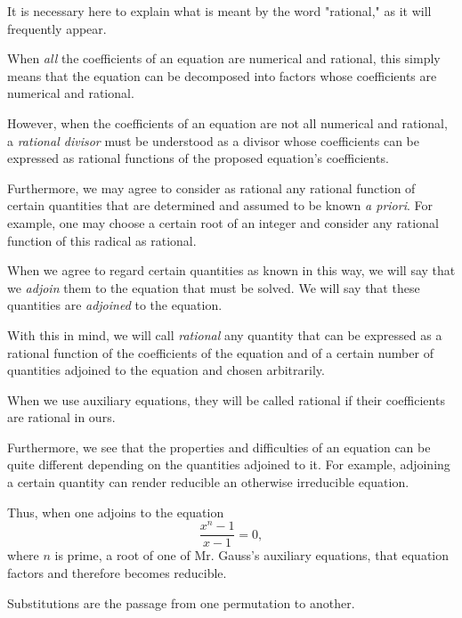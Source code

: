 \documentclass{article}
\begin{document}
It is necessary here to explain what is meant by the word "rational," as it will frequently appear.

When \textit{all} the coefficients of an equation are numerical and rational, this simply means that the equation can be decomposed into factors whose coefficients are numerical and rational.

However, when the coefficients of an equation are not all numerical and rational, a \textit{rational divisor} must be understood as a divisor whose coefficients can be expressed as rational functions of the proposed equation's coefficients.

Furthermore, we may agree to consider as rational any rational function of certain quantities that are determined and assumed to be known \textit{a priori}. For example, one may choose a certain root of an integer and consider any rational function of this radical as rational.

\medskip

When we agree to regard certain quantities as known in this way, we will say that we \emph{adjoin} them to the equation that must be solved. We will say that these quantities are \emph{adjoined} to the equation.

\smallskip

With this in mind, we will call \emph{rational} any quantity that can be expressed as a rational function of the coefficients of the equation and of a certain number of quantities adjoined to the equation and chosen arbitrarily.

\smallskip

When we use auxiliary equations, they will be called rational if their coefficients are rational in ours.

\smallskip

Furthermore, we see that the properties and difficulties of an equation can be quite different depending on the quantities adjoined to it. For example, adjoining a certain quantity can render reducible an otherwise irreducible equation.

\smallskip

Thus, when one adjoins to the equation
\[
\frac{x^n - 1}{x-1} = 0,
\]
where $n$ is prime, a root of one of Mr. Gauss's auxiliary equations, that equation factors and therefore becomes reducible.

\smallskip

Substitutions are the passage from one permutation to another.

\smallskip
\end{document}
